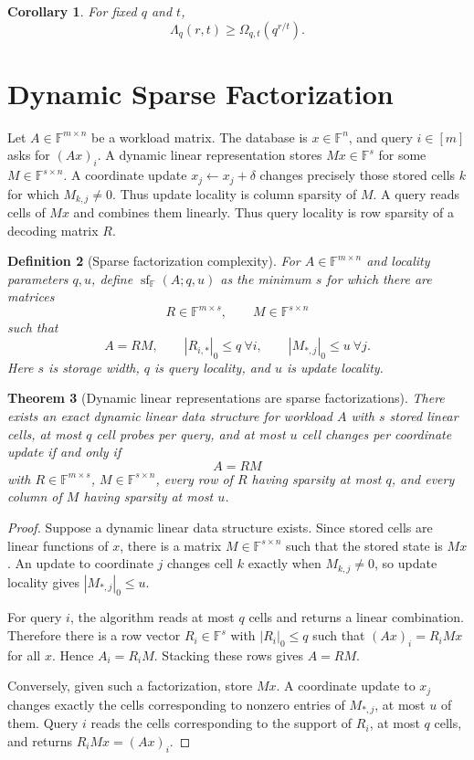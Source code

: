 \documentclass[11pt]{article}
\newtheorem{theorem}{Theorem}[section]
\newtheorem{definition}[theorem]{Definition}
\newtheorem{corollary}[theorem]{Corollary}
\begin{document}
\begin{corollary}
For fixed $q$ and $t$,
\[
\Lambda_q(r,t)\ge \Omega_{q,t}(q^{r/t}).
\]
\end{corollary}

\section{Dynamic Sparse Factorization}

Let $A\in\mathbb F^{m\times n}$ be a workload matrix. The database is $x\in\mathbb F^n$, and query $i\in[m]$ asks for $(Ax)_i$. A dynamic linear representation stores $Mx\in\mathbb F^s$ for some $M\in\mathbb F^{s\times n}$. A coordinate update $x_j\leftarrow x_j+\delta$ changes precisely those stored cells $k$ for which $M_{k,j}\ne 0$. Thus update locality is column sparsity of $M$. A query reads cells of $Mx$ and combines them linearly. Thus query locality is row sparsity of a decoding matrix $R$.

\begin{definition}[Sparse factorization complexity]
For $A\in\mathbb F^{m\times n}$ and locality parameters $q,u$, define $\operatorname{sf}_{\mathbb F}(A;q,u)$ as the minimum $s$ for which there are matrices
\[
R\in\mathbb F^{m\times s},
\qquad
M\in\mathbb F^{s\times n}
\]
such that
\[
A=RM,
\qquad
|R_{i,*}|_0\le q\ \forall i,
\qquad
|M_{*,j}|_0\le u\ \forall j.
\]
Here $s$ is storage width, $q$ is query locality, and $u$ is update locality.
\end{definition}

\begin{theorem}[Dynamic linear representations are sparse factorizations]
There exists an exact dynamic linear data structure for workload $A$ with $s$ stored linear cells, at most $q$ cell probes per query, and at most $u$ cell changes per coordinate update if and only if
\[
A=RM
\]
with $R\in\mathbb F^{m\times s}$, $M\in\mathbb F^{s\times n}$, every row of $R$ having sparsity at most $q$, and every column of $M$ having sparsity at most $u$.
\end{theorem}

\begin{proof}
Suppose a dynamic linear data structure exists. Since stored cells are linear functions of $x$, there is a matrix $M\in\mathbb F^{s\times n}$ such that the stored state is $Mx$. An update to coordinate $j$ changes cell $k$ exactly when $M_{k,j}\ne0$, so update locality gives $|M_{*,j}|_0\le u$.

For query $i$, the algorithm reads at most $q$ cells and returns a linear combination. Therefore there is a row vector $R_i\in\mathbb F^s$ with $|R_i|_0\le q$ such that $(Ax)_i=R_iMx$ for all $x$. Hence $A_i=R_iM$. Stacking these rows gives $A=RM$.

Conversely, given such a factorization, store $Mx$. A coordinate update to $x_j$ changes exactly the cells corresponding to nonzero entries of $M_{*,j}$, at most $u$ of them. Query $i$ reads the cells corresponding to the support of $R_i$, at most $q$ cells, and returns $R_iMx=(Ax)_i$.
\end{proof}
\end{document}
